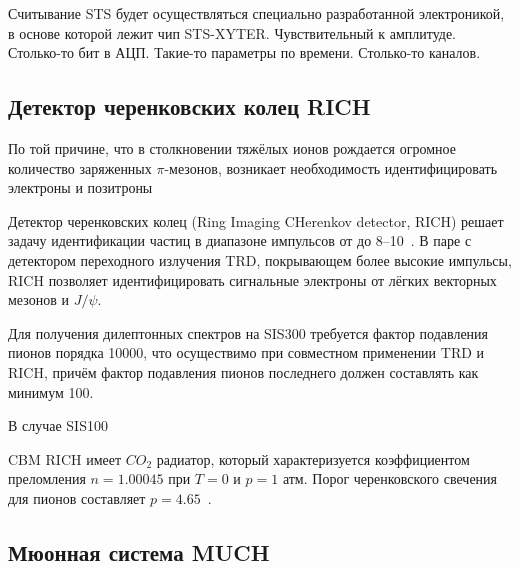 Считывание STS будет осуществляться специально разработанной электроникой, в основе которой лежит чип STS-XYTER.
Чувствительный к амплитуде.
Столько-то бит в АЦП.
Такие-то параметры по времени.
Столько-то каналов.



\subsection{Детектор черенковских колец RICH}\label{sec:secRICH}

По той причине, что в столкновении тяжёлых ионов рождается огромное количество заряженных $\pi$-мезонов, возникает необходимость идентифицировать электроны и позитроны

Детектор черенковских колец (Ring Imaging CHerenkov detector, RICH) решает задачу идентификации частиц в диапазоне импульсов от \todo до 8--10~\GeVoverC.
В паре с детектором переходного излучения TRD, покрывающем более высокие импульсы, RICH позволяет идентифицировать сигнальные электроны от лёгких векторных мезонов и $J/\psi$.

Для получения дилептонных спектров на SIS300 требуется фактор \todo подавления пионов порядка 10000, что осуществимо при совместном применении TRD и RICH, причём фактор \todo подавления пионов последнего должен составлять как минимум 100.

В случае SIS100 

CBM RICH имеет $CO_{2}$ радиатор, который характеризуется коэффициентом преломления $n=1.00045$ при $T=0$ и $p=1$ атм.
Порог черенковского свечения для пионов составляет $p=4.65$~\GeVoverC.



\subsection{Мюонная система MUCH}\label{sec:secMUCH}


